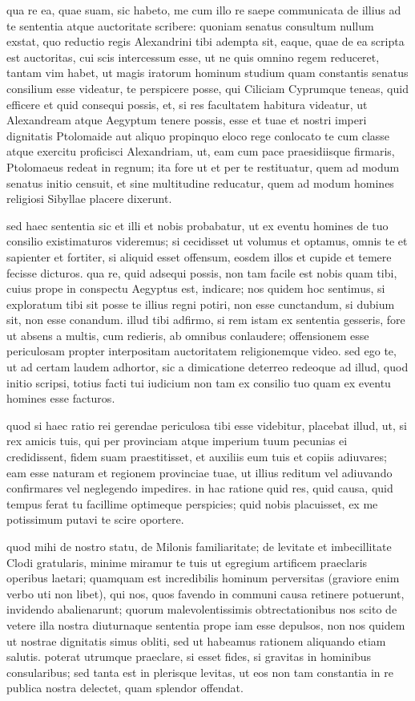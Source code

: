  qua re ea, quae suam, sic habeto, me cum illo re saepe communicata de illius ad te sententia atque auctoritate scribere: quoniam senatus consultum nullum exstat, quo reductio regis Alexandrini tibi adempta sit, eaque, quae de ea scripta est auctoritas, cui scis intercessum esse, ut ne quis omnino regem reduceret, tantam vim habet, ut magis iratorum hominum studium quam constantis senatus consilium esse videatur, te perspicere posse, qui Ciliciam Cyprumque teneas, quid efficere et quid consequi possis, et, si res facultatem habitura videatur, ut Alexandream atque Aegyptum tenere possis, esse et tuae et nostri imperi dignitatis Ptolomaide aut aliquo propinquo eloco rege conlocato te cum classe atque exercitu proficisci Alexandriam, ut, eam cum pace praesidiisque firmaris, Ptolomaeus redeat in regnum; ita fore ut et per te restituatur, quem ad modum senatus initio censuit, et sine multitudine reducatur, quem ad modum homines religiosi Sibyllae placere dixerunt.

 sed haec sententia sic et illi et nobis probabatur, ut ex eventu homines de tuo consilio existimaturos videremus; si cecidisset ut volumus et optamus, omnis te et sapienter et fortiter, si aliquid esset offensum, eosdem illos et cupide et temere fecisse dicturos. qua re, quid adsequi possis, non tam facile est nobis quam tibi, cuius prope in conspectu Aegyptus est, indicare; nos quidem hoc sentimus, si exploratum tibi sit posse te illius regni potiri, non esse cunctandum, si dubium sit, non esse conandum. illud tibi adfirmo, si rem istam ex sententia gesseris, fore ut absens a multis, cum redieris, ab omnibus conlaudere; offensionem esse periculosam propter interpositam auctoritatem religionemque video. sed ego te, ut ad certam laudem adhortor, sic a dimicatione deterreo redeoque ad illud, quod initio scripsi, totius facti tui iudicium non tam ex consilio tuo quam ex eventu homines esse facturos.

 quod si haec ratio rei gerendae periculosa tibi esse videbitur, placebat illud, ut, si rex amicis tuis, qui per provinciam atque imperium tuum pecunias ei credidissent, fidem suam praestitisset, et auxiliis eum tuis et copiis adiuvares; eam esse naturam et regionem provinciae tuae, ut illius reditum vel adiuvando confirmares vel neglegendo impedires. in hac ratione quid res, quid causa, quid tempus ferat tu facillime optimeque perspicies; quid nobis placuisset, ex me potissimum putavi te scire oportere.

 quod mihi de nostro statu, de Milonis familiaritate; de levitate et imbecillitate Clodi gratularis, minime miramur te tuis ut egregium artificem praeclaris operibus laetari; quamquam est incredibilis hominum perversitas (graviore enim verbo uti non libet), qui nos, quos favendo in communi causa retinere potuerunt, invidendo abalienarunt; quorum malevolentissimis obtrectationibus nos scito de vetere illa nostra diuturnaque sententia prope iam esse depulsos, non nos quidem ut nostrae dignitatis simus obliti, sed ut habeamus rationem aliquando etiam salutis. poterat utrumque praeclare, si esset fides, si gravitas in hominibus consularibus; sed tanta est in plerisque levitas, ut eos non tam constantia in re publica nostra delectet, quam splendor offendat.

